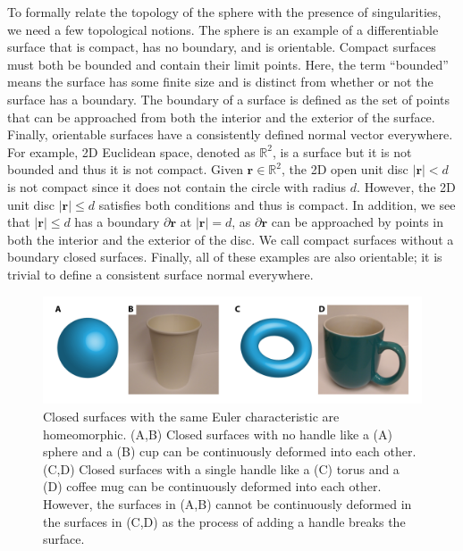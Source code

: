To formally relate the topology of the sphere with the presence of singularities, we need a few topological notions.
The sphere is an example of a differentiable surface that is compact, has no boundary, and is orientable.
Compact surfaces must both be bounded and contain their limit points.
Here, the term ``bounded'' means the surface has some finite size and is distinct from whether or not the surface has a boundary.
The boundary of a surface is defined as the set of points that can be approached from both the interior and the exterior of the surface.
Finally, orientable surfaces have a consistently defined normal vector everywhere.
For example, 2D Euclidean space, denoted as $\mathbb{R}^2$, is a surface but it is not bounded and thus it is not compact.
Given $\mathbf{r} \in \mathbb{R}^2$, the 2D open unit disc $|\mathbf{r}| < d$ is not compact since it does not contain the circle with radius $d$.
However, the 2D unit disc $|\mathbf{r}| \leq d$ satisfies both conditions and thus is compact.
In addition, we see that $|\mathbf{r}| \leq d$ has a boundary $\partial \mathbf{r}$ at $|\mathbf{r}| = d$, as $\partial \mathbf{r}$ can be approached by points in both the interior and the exterior of the disc.
We call compact surfaces without a boundary closed surfaces.
Finally, all of these examples are also orientable; it is trivial to define a consistent surface normal everywhere.
\begin{figure}
  \centering
  \includegraphics{figures/C1/Ch1-Figs_ChiObjects.png}
  \caption{Closed surfaces with the same Euler characteristic are homeomorphic. (A,B) Closed surfaces with no handle like a (A) sphere and a (B) cup can be continuously deformed into each other.
  (C,D) Closed surfaces with a single handle like a (C) torus and a (D) coffee mug can be continuously deformed into each other.
  However, the surfaces in (A,B) cannot be continuously deformed in the surfaces in (C,D) as the process of adding a handle breaks the surface.}\label{f:1-ChiObjects}
\end{figure}

